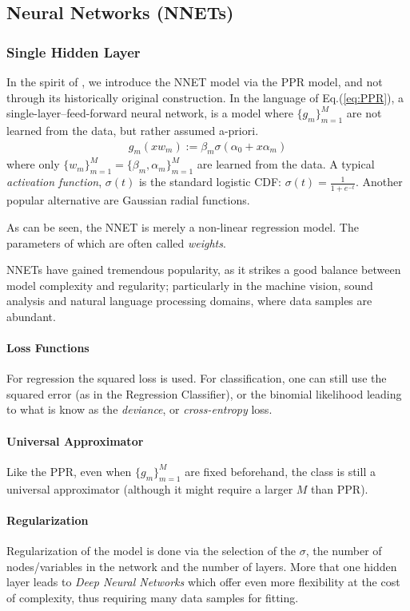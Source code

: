 \documentclass[12pt,a4paper]{article}
\theoremstyle{plain}
\theoremstyle{definition}
\begin{document}
\subsection{Neural Networks (NNETs)}
\subsubsection{Single Hidden Layer}
In the spirit of \cite[Section 11]{hastie_elements_2003}, we introduce the NNET model via the PPR model, and not through its historically original construction.
In the language of Eq.(\ref{eq:PPR}), a single-layer--feed-forward neural network, is a model where $\{g_m\}_{m=1}^M$  are not learned from the data, but rather assumed a-priori. 
\begin{align*}
	g_m(x w_m):= \beta_m \sigma(\alpha_0 + x \alpha_m )
\end{align*}
where only $\{w_m\}_{m=1}^M = \{\beta_m, \alpha_m\}_{m=1}^M$ are learned from the data. 
A typical \emph{activation function}, $\sigma(t)$ is the standard logistic CDF: $\sigma(t)=\frac{1}{1+e^{-t}}$. Another popular alternative are Gaussian radial functions.

As can be seen, the NNET is merely a non-linear regression model.
The parameters of which are often called \emph{weights}.

NNETs have gained tremendous popularity, as it strikes a good balance between model complexity and regularity; particularly in the machine vision, sound analysis and natural language processing domains, where data samples are abundant.

\paragraph{Loss Functions}
For regression the squared loss is used. For classification, one can still use the squared error (as in the Regression Classifier), or the binomial likelihood leading to what is know as the \emph{deviance}, or \emph{cross-entropy} loss.

\paragraph{Universal Approximator}
Like the PPR, even when $\{g_m\}_{m=1}^M$ are fixed beforehand, the class is still a universal approximator (although it might require a larger $M$ than PPR).

\paragraph{Regularization}
Regularization of the model is done via the selection of the $\sigma$, the number of nodes/variables in the network and the number of layers. More that one hidden layer leads to \emph{Deep Neural Networks} which offer even more flexibility at the cost of complexity, thus requiring many data samples for fitting.
\end{document}
